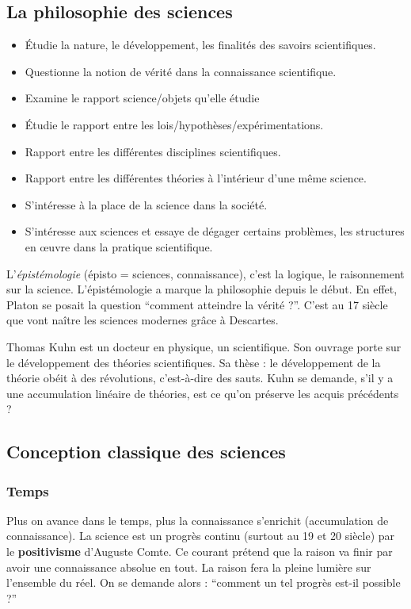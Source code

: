 \subsection{La philosophie des sciences}
\begin{itemize}
	\item Étudie la nature, le développement, les finalités des savoirs scientifiques.
	\item Questionne la notion de vérité dans la connaissance scientifique.
	\item Examine le rapport science/objets qu'elle étudie
	\item Étudie le rapport entre les lois/hypothèses/expérimentations.
	\item Rapport entre les différentes disciplines scientifiques.
	\item Rapport entre les différentes théories à l'intérieur d'une même science.
	\item S'intéresse à la place de la science dans la société.
	\item S'intéresse aux sciences et essaye de dégager certains problèmes, les structures en œuvre dans la pratique scientifique.
\end{itemize}

L'\emph{épistémologie} (épisto = sciences, connaissance), c'est la logique, le raisonnement sur la science.
L'épistémologie a marque la philosophie depuis le début.
En effet, Platon se posait la question ``comment atteindre la vérité ?''.
C'est au 17\ieme{} siècle que vont naître les sciences modernes grâce à Descartes.

Thomas Kuhn est un docteur en physique, un scientifique.
Son ouvrage porte sur le développement des théories scientifiques.
Sa thèse : le développement de la théorie obéit à des révolutions, c'est-à-dire des sauts.
Kuhn se demande, s'il y a une accumulation linéaire de théories, est ce qu'on préserve les acquis précédents ?

\subsection{Conception classique des sciences}
\subsubsection{Temps}
Plus on avance dans le temps, plus la connaissance s'enrichit (accumulation de connaissance).
La science est un progrès continu (surtout au 19\ieme{} et 20\ieme{} siècle) par le \textbf{positivisme} d'Auguste Comte.
Ce courant prétend que la raison va finir par avoir une connaissance absolue en tout.
La raison fera la pleine lumière sur l'ensemble du réel.
On se demande alors : ``comment un tel progrès est-il possible ?''
